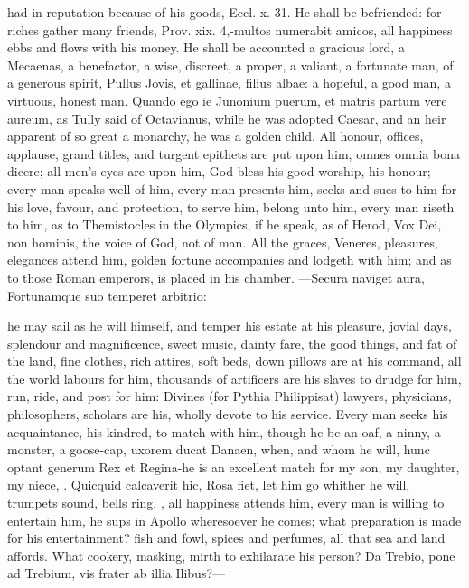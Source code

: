 {had in reputation because of his goods, Eccl. x. 31. He shall be
befriended: for riches gather many friends, Prov. xix. 4,-multos
numerabit amicos, all happiness ebbs and flows with his money. He
shall be accounted a gracious lord, a Mecaenas, a benefactor, a wise,
discreet, a proper, a valiant, a fortunate man, of a generous spirit,
Pullus Jovis, et gallinae, filius albae: a hopeful, a good man, a
virtuous, honest man. Quando ego ie Junonium puerum, et matris partum
vere aureum, as Tully said of Octavianus, while he was adopted
Caesar, and an heir apparent of so great a monarchy, he was a
golden child. All honour, offices, applause, grand titles, and
turgent epithets are put upon him, omnes omnia bona dicere; all men's
eyes are upon him, God bless his good worship, his honour; every
man speaks well of him, every man presents him, seeks and sues to him
for his love, favour, and protection, to serve him, belong unto him,
every man riseth to him, as to Themistocles in the Olympics, if he
speak, as of Herod, Vox Dei, non hominis, the voice of God, not of man.
All the graces, Veneres, pleasures, elegances attend him,  golden
fortune accompanies and lodgeth with him; and as to those Roman
emperors, is placed in his chamber.
---Secura naviget aura,
Fortunamque suo temperet arbitrio:

he may sail as he will himself, and temper his estate at his pleasure,
jovial days, splendour and magnificence, sweet music, dainty fare, the
good things, and fat of the land, fine clothes, rich attires, soft
beds, down pillows are at his command, all the world labours for him,
thousands of artificers are his slaves to drudge for him, run, ride,
and post for him: Divines (for Pythia Philippisat) lawyers,
physicians, philosophers, scholars are his, wholly devote to his
service. Every man seeks his acquaintance, his kindred, to match
with him, though he be an oaf, a ninny, a monster, a goose-cap, uxorem
ducat Danaen, when, and whom he will, hunc optant generum Rex et
Regina-he is an excellent match for my son, my daughter, my
niece, \etc{}. Quicquid calcaverit hic, Rosa fiet, let him go whither he
will, trumpets sound, bells ring, \etc{}, all happiness attends him, every
man is willing to entertain him, he sups in Apollo wheresoever he
comes; what preparation is made for his entertainment? fish and
fowl, spices and perfumes, all that sea and land affords. What cookery,
masking, mirth to exhilarate his person?
Da Trebio, pone ad Trebium, vis frater ab illia
Ilibus?---

}
